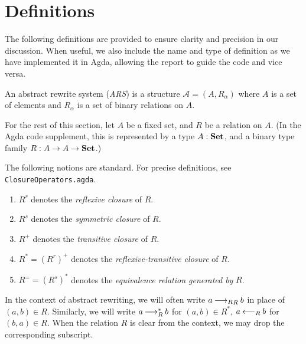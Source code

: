 \section{Definitions}
\label{sec:Definitions}

The following definitions are provided to ensure clarity and precision
in our discussion.
 When useful, we also include the name and type of
definition as we have implemented it in Agda, allowing the report to guide the code
and vice versa.



\begin{definition}
    An abstract rewrite system (\emph{ARS}) is a structure $\mathcal{A} = (A, R_\alpha)$ where
     $A$ is a set of elements and $R_\alpha$ is a set of binary relations on $A$.
\end{definition}

For the rest of this section, let $A$ be a fixed set, and $R$ be a relation on $A$.
(In the Agda code supplement, this is represented by a type $A : \mathbf{Set}$,
and a binary type family $R : A \to A \to \mathbf{Set}$.)



\begin{notation}
  The following notions are standard.  For precise definitions,
  see \texttt{ClosureOperators.agda}.
  \begin{enumerate}
    \item $R^r$ denotes the \emph{reflexive closure} of $R$.
    \item $R^s$ denotes the \emph{symmetric closure} of $R$.
    \item $R^+$ denotes the \emph{transitive closure} of $R$.
    \item $R^* = (R^r)^+$ denotes the \emph{reflexive-transitive closure} of $R$.
    \item $R^= = (R^s)^*$ denotes the \emph{equivalence relation generated by} $R$.
  \end{enumerate}
\end{notation}




In the context of abstract rewriting, we will often write $a \mathbin{\longrightarrow_R}_R b$
in place of $(a,b) \in R$.  Similarly, we will write $a \mathbin{\longrightarrow_R^*} b$ for $(a,b) \in R^*$,
$a \mathbin{\longleftarrow_R} b$ for $(b,a) \in R$.  When the relation $R$ is clear from the context,
we may drop the corresponding subscript.

